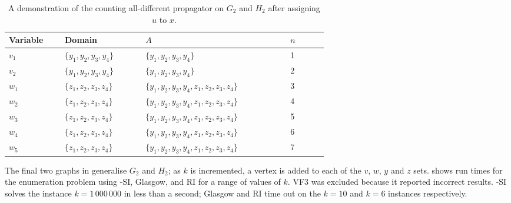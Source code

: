 \begin{table}[h!]
\centering
\footnotesize
    \begin{tabular}{p{0.09\linewidth} p{0.16\linewidth} p{0.3\linewidth} p{0.08\linewidth}}
 \toprule
     Variable & Domain & $A$ & $n$\\ [0.5ex]
 \midrule
     $v_1$ & $\{y_1,y_2,y_3,y_4\}$ & $\{y_1,y_2,y_3,y_4\}$ & 1\\
     $v_2$ & $\{y_1,y_2,y_3,y_4\}$ & $\{y_1,y_2,y_3,y_4\}$ & 2\\
     $w_1$ & $\{z_1,z_2,z_3,z_4\}$ & $\{y_1,y_2,y_3,y_4,z_1,z_2,z_3,z_4\}$ & 3\\
     $w_2$ & $\{z_1,z_2,z_3,z_4\}$ & $\{y_1,y_2,y_3,y_4,z_1,z_2,z_3,z_4\}$ & 4\\
     $w_3$ & $\{z_1,z_2,z_3,z_4\}$ & $\{y_1,y_2,y_3,y_4,z_1,z_2,z_3,z_4\}$ & 5\\
     $w_4$ & $\{z_1,z_2,z_3,z_4\}$ & $\{y_1,y_2,y_3,y_4,z_1,z_2,z_3,z_4\}$ & 6\\
     $w_5$ & $\{z_1,z_2,z_3,z_4\}$ & $\{y_1,y_2,y_3,y_4,z_1,z_2,z_3,z_4\}$ & 7\\
 \bottomrule
\end{tabular}
\caption{A demonstration of the counting all-different propagator on $G_2$ and $H_2$
    after assigning $u$ to $x$.}
\label{tab:counting-all-diff}
\end{table}

The final two graphs in  generalise $G_2$ and $H_2$; as $k$ is incremented,
a vertex is added to each of the $v$, $w$, $y$ and $z$ sets.
 shows run times for the enumeration problem
using \McSplit-SI, Glasgow, and RI for a range of values of $k$.
VF3 was excluded because it reported incorrect results.
\McSplit-SI solves the instance $k=1\,000\,000$ in less than a second;
Glasgow and RI time out on the $k=10$ and $k=6$ instances respectively.

